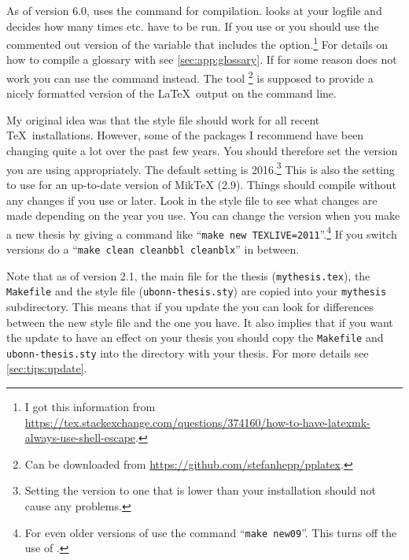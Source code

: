 As of version 6.0,  uses the  command for compilation.
 looks at your logfile and decides how many times  etc.
have to be run.
If you use  or  you should use the commented out version
of the  variable that includes the  option.\footnote{%
  I got this information from \url{https://tex.stackexchange.com/questions/374160/how-to-have-latexmk-always-use-shell-escape}.}
For details on how to compile a glossary with  see \cref{sec:app:glossary}.
If for some reason  does not work you can use the command
 instead.
The tool \footnote{%
Can be downloaded from \url{https://github.com/stefanhepp/pplatex}.
}
is supposed to provide a nicely formatted version of the \LaTeX\ output on the command line.

My original idea was that the style file should work for all recent
\TeX\ installations.  However, some of the packages I recommend have
been changing quite a lot over the past few years. 
You should therefore set the \TeXLive version you are using appropriately.
The default setting is 2016.\footnote{%
Setting the \TeXLive version to one that is lower than your installation should not cause any problems.}
This is also the setting to use for an up-to-date version of MikTeX (2.9).
Things should compile without any changes if you use  or later.
Look in the style file to see what changes are made depending on the year you use.
You can change the \TeXLive version when you make a new thesis 
by giving a command like \enquote{\texttt{make new TEXLIVE=2011}}.\footnote{%
For even older versions of \TeXLive use the command \enquote{\texttt{make new09}}.
This turns off the use of .}
If you switch \TeXLive versions do a
\enquote{\texttt{make clean cleanbbl cleanblx}} in between.

Note that as of version 2.1, the main file for the thesis
(\texttt{mythesis.tex}), the \texttt{Makefile} and the style file
(\texttt{ubonn-thesis.sty}) are copied into your \texttt{mythesis}
subdirectory. This means that if you update the 
you can look for differences between the new style file and the one
you have. It also implies that if you want the update to have an
effect on your thesis you should copy the \texttt{Makefile} and
\texttt{ubonn-thesis.sty} into the directory with your thesis.
For more details see \cref{sec:tips:update}.

